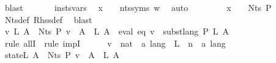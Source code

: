 \begin{isabellebody}
\ blast\isanewline
\ \ \ \ \isamarkupfalse%
\ {\isacharasterisk}{\kern0pt}{\isacharasterisk}{\kern0pt}\ insts{\isacharprime}{\kern0pt}{\isacharunderscore}{\kern0pt}vars\ \isamarkupfalse%
\ {\isachardoublequoteopen}x\ {\isasymin}\ {\isasymgamma}{\isacharprime}{\kern0pt}\ {\isacharbackquote}{\kern0pt}\ nts{\isacharunderscore}{\kern0pt}syms\ w{\isachardoublequoteclose}\ \isamarkupfalse%
\ auto\isanewline
\ \ \ \ \isamarkupfalse%
\ {\isacharasterisk}{\kern0pt}{\isacharasterisk}{\kern0pt}{\isacharasterisk}{\kern0pt}\ \isamarkupfalse%
\ {\isachardoublequoteopen}x\ {\isasymin}\ {\isasymgamma}{\isacharprime}{\kern0pt}\ {\isacharbackquote}{\kern0pt}\ Nts\ P{\isachardoublequoteclose}\ \isamarkupfalse%
\ Nts{\isacharunderscore}{\kern0pt}def\ Rhss{\isacharunderscore}{\kern0pt}def\ \isamarkupfalse%
\ blast\isanewline
\ \ \isamarkupfalse%
\isanewline
\ \ \isamarkupfalse%
\ \isamarkupfalse%
\ {\isachardoublequoteopen}{\isasymforall}v\ L{\isachardot}{\kern0pt}\ {\isacharparenleft}{\kern0pt}{\isasymforall}A\ {\isasymin}\ Nts\ P{\isachardot}{\kern0pt}\ v\ {\isacharparenleft}{\kern0pt}{\isasymgamma}{\isacharprime}{\kern0pt}\ A{\isacharparenright}{\kern0pt}\ {\isacharequal}{\kern0pt}\ L\ A{\isacharparenright}{\kern0pt}\ {\isasymlongrightarrow}\ eval\ eq\ v\ {\isacharequal}{\kern0pt}\ subst{\isacharunderscore}{\kern0pt}lang\ P\ L\ A{\isachardoublequoteclose}\isanewline
\ \ \isamarkupfalse%
\ {\isacharparenleft}{\kern0pt}rule\ allI\ {\isacharbar}{\kern0pt}\ rule\ impI{\isacharparenright}{\kern0pt}{\isacharplus}{\kern0pt}\isanewline
\ \ \ \ \isamarkupfalse%
\ v\ {\isacharcolon}{\kern0pt}{\isacharcolon}{\kern0pt}\ {\isachardoublequoteopen}nat\ {\isasymRightarrow}\ {\isacharprime}{\kern0pt}a\ lang{\isachardoublequoteclose}\ \ L\ {\isacharcolon}{\kern0pt}{\isacharcolon}{\kern0pt}\ {\isachardoublequoteopen}{\isacharprime}{\kern0pt}n\ {\isasymRightarrow}\ {\isacharprime}{\kern0pt}a\ lang{\isachardoublequoteclose}\isanewline
\ \ \ \ \isamarkupfalse%
\ state{\isacharunderscore}{\kern0pt}L{\isacharcolon}{\kern0pt}\ {\isachardoublequoteopen}{\isasymforall}A\ {\isasymin}\ Nts\ P{\isachardot}{\kern0pt}\ v\ {\isacharparenleft}{\kern0pt}{\isasymgamma}{\isacharprime}{\kern0pt}\ A{\isacharparenright}{\kern0pt}\ {\isacharequal}{\kern0pt}\ L\ A{\isachardoublequoteclose}\isanewline
\ \ \ \ \isamarkupfalse%

\end{isabellebody}
